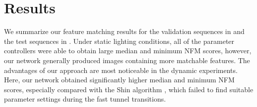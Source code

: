 \documentclass[letterpaper, 10pt, journal, twoside]{IEEEtran}
\begin{document}
\section{Results}

We summarize our feature matching results for the validation sequences in  and the test sequences in . 
Under static lighting conditions, all of the parameter controllers were able to obtain large median and minimum NFM scores, however, our network generally produced images containing more matchable features.
The advantages of our approach are most noticeable in the dynamic experiments. 
Here, our network obtained significantly higher median and minimum NFM scores, especially compared with the Shin algorithm \cite{Shin2019}, which failed to find suitable parameter settings during the fast tunnel transitions.
\end{document}
